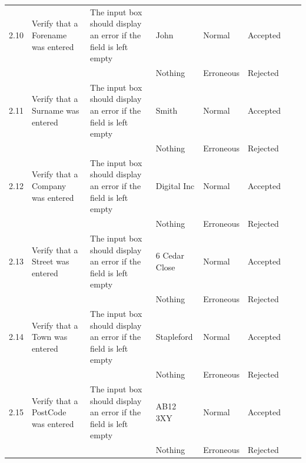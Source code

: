 \begin{landscape}
\begin{center}
\begin{longtable}{|p{1.5cm}|p{2cm}|p{3cm}|p{2cm}|p{2cm}|p{2.5cm}|p{2cm}|p{2cm}|}
        2.10 & Verify that a Forename was entered & The input box should display an error if the field is left empty & John & Normal & Accepted & & \\   
             &                                      &                                                               & Nothing      & Erroneous & Rejected & & \\ \hline
             
        2.11 & Verify that a Surname was entered & The input box should display an error if the field is left empty & Smith & Normal & Accepted & & \\   
             &                                      &                                                               & Nothing      & Erroneous & Rejected & & \\ \hline
        
        2.12 & Verify that a Company was entered & The input box should display an error if the field is left empty & Digital Inc & Normal & Accepted & & \\   
             &                                      &                                                               & Nothing      & Erroneous & Rejected & & \\ \hline
             
        2.13 & Verify that a Street was entered & The input box should display an error if the field is left empty & 6 Cedar Close & Normal & Accepted & & \\   
             &                                      &                                                               & Nothing      & Erroneous & Rejected & & \\ \hline
             
        2.14 & Verify that a Town was entered & The input box should display an error if the field is left empty & Stapleford & Normal & Accepted & & \\   
             &                                      &                                                               & Nothing      & Erroneous & Rejected & & \\ \hline
             
        2.15 & Verify that a PostCode was entered & The input box should display an error if the field is left empty & AB12 3XY & Normal & Accepted & & \\   
             &                                      &                                                               & Nothing      & Erroneous & Rejected & & \\ \hline
             

\end{longtable}
\end{center}
\end{landscape}
